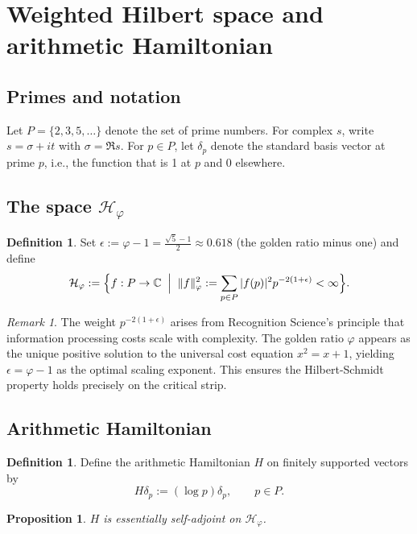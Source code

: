 \documentclass[12pt]{article}
\newtheorem{proposition}[theorem]{Proposition}
\theoremstyle{definition}
\newtheorem{definition}[theorem]{Definition}
\theoremstyle{remark}
\newtheorem{remark}[theorem]{Remark}
\newcommand{\Hspace}{\mathcal{H}}
\begin{document}
\section{Weighted Hilbert space and arithmetic Hamiltonian}\label{sec:hilbert}

\subsection{Primes and notation}
Let $P=\{2,3,5,\dots\}$ denote the set of prime numbers.
For complex $s$, write $s=\sigma+it$ with $\sigma=\Re s$.
For $p \in P$, let $\delta_p$ denote the standard basis vector at prime $p$,
i.e., the function that is 1 at $p$ and 0 elsewhere.

\subsection{The space $\Hspace_{\varphi}$}

\begin{definition}\label{def:Hphi}
Set $\displaystyle\epsilon:=\varphi-1=\frac{\sqrt{5}-1}{2}\approx0.618$ (the golden ratio minus one) and define
\[
  \Hspace_{\varphi}:=
  \Bigl\{f:P\to\mathbb{C}\;\Bigm|\;
        \|f\|_{\varphi}^{2}:=\sum_{p \in P}|f(p)|^{2}p^{-2(1+\epsilon)}<\infty
  \Bigr\}.
\]
\end{definition}

\begin{remark}
The weight $p^{-2(1+\epsilon)}$ arises from Recognition Science's principle
that information processing costs scale with complexity. The golden ratio
$\varphi$ appears as the unique positive solution to the universal cost equation
$x^2 = x + 1$, yielding $\epsilon = \varphi - 1$ as the optimal scaling exponent.
This ensures the Hilbert-Schmidt property holds precisely on the critical strip.
\end{remark}

\subsection{Arithmetic Hamiltonian}

\begin{definition}
Define the arithmetic Hamiltonian $H$ on finitely supported vectors by
\[
   H\delta_{p}:=(\log p)\delta_{p},\qquad p\in P.
\]
\end{definition}

\begin{proposition}\label{prop:selfadjoint}
$H$ is essentially self-adjoint on $\Hspace_{\varphi}$.
\end{proposition}
\end{document}
